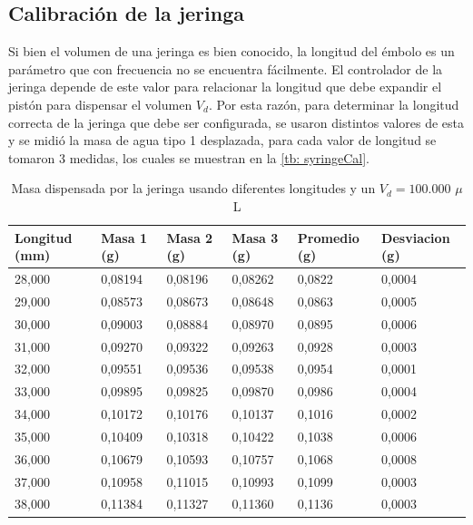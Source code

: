 	\subsection{Calibraci\'on de la jeringa}
	Si bien el volumen de una jeringa es bien conocido, la longitud del émbolo es un parámetro que con frecuencia no se encuentra fácilmente. El controlador de la jeringa depende de este valor para relacionar la longitud que debe expandir el pistón para dispensar el volumen $V_d$. Por esta razón, para determinar la longitud correcta de la jeringa que debe ser configurada, se usaron distintos valores de esta y se midió la masa de agua tipo 1 desplazada, para cada valor de longitud se tomaron 3 medidas, los cuales se muestran en la \autoref{tb: syringeCal}.
	\begin{table}[h]
		\centering
		\caption{Masa dispensada por la jeringa usando diferentes longitudes y un $V_d = 100.000$ $\mu$L}
		\small
		\begin{tabular}{p{1.7cm}|p{1.3cm}p{1.3cm}p{1.3cm}|p{2cm}p{2cm}}
			\hline
			\textbf{Longitud (mm)} &  \textbf{Masa 1 (g)} &  \textbf{Masa 2} (g) &  \textbf{Masa 3 (g)} &  \textbf{Promedio (g)} & \textbf{Desviacion (g)} \\
			\hline
			28,000 & 0,08194 & 0,08196 & 0,08262 & 0,0822 & 0,0004 \\
			29,000 & 0,08573 & 0,08673 & 0,08648 & 0,0863 & 0,0005 \\
			30,000 & 0,09003 & 0,08884 & 0,08970 & 0,0895 & 0,0006 \\
			31,000 & 0,09270 & 0,09322 & 0,09263 & 0,0928 & 0,0003 \\
			32,000 & 0,09551 & 0,09536 & 0,09538 & 0,0954 & 0,0001 \\
			33,000 & 0,09895 & 0,09825 & 0,09870 & 0,0986 & 0,0004 \\
			34,000 & 0,10172 & 0,10176 & 0,10137 & 0,1016 & 0,0002 \\
			35,000 & 0,10409 & 0,10318 & 0,10422 & 0,1038 & 0,0006 \\
			36,000 & 0,10679 & 0,10593 & 0,10757 & 0,1068 & 0,0008 \\
			37,000 & 0,10958 & 0,11015 & 0,10993 & 0,1099 & 0,0003 \\
			38,000 & 0,11384 & 0,11327 & 0,11360 & 0,1136 & 0,0003 \\
			\hline
		\end{tabular}
		\label{tb: syringeCal}
	\end{table}
	
